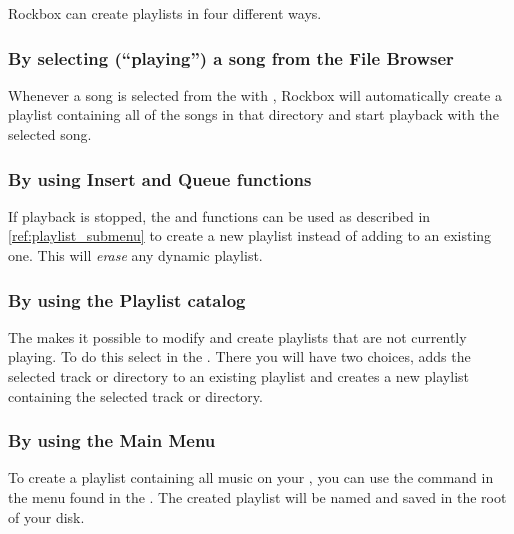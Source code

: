 Rockbox can create playlists in four different ways.

\subsubsection{By selecting (``playing'') a song from the File Browser}
Whenever a song is selected from the  with
\ActionTreeEnter, Rockbox will automatically create a playlist containing
all of the songs in that directory and start playback with the selected
song.


\subsubsection{By using Insert and Queue functions}
If playback is stopped, the  and  functions
can be used as described in \ref{ref:playlist_submenu}
to create a new playlist instead of adding to an existing one.
This will \emph{erase} any dynamic playlist.

\subsubsection{\label{ref:playlist_catalog}By using the Playlist catalog}
The  makes it possible to modify and create playlists
that are not currently playing. To do this select 
in the . There you will have two choices,
 adds the selected track or directory to an existing
playlist and  creates a new playlist containing
the selected track or directory.


\subsubsection{By using the Main Menu}
To create a playlist containing all music on your \dap{}, you can use the
 command in the  menu found
in the . The created playlist will be named
 and saved in the root of your \daps{} disk.

